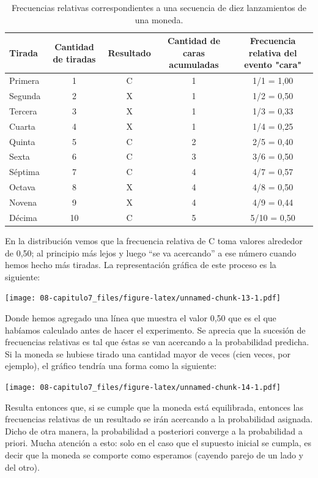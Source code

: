 \documentclass[]{article}
\begin{document}
\begin{table}

\caption{\label{tab:unnamed-chunk-12}Frecuencias relativas correspondientes a una secuencia de diez lanzamientos de una moneda.}
\centering
\begin{tabular}[t]{lcccc}
\toprule
Tirada & Cantidad de tiradas & Resultado & Cantidad de caras acumuladas & Frecuencia relativa del evento "cara"\\
\midrule
\rowcolor{gray!6}  Primera & 1 & C & 1 & 1/1 = 1,00\\
Segunda & 2 & X & 1 & 1/2 = 0,50\\
\rowcolor{gray!6}  Tercera & 3 & X & 1 & 1/3 = 0,33\\
Cuarta & 4 & X & 1 & 1/4 = 0,25\\
\rowcolor{gray!6}  Quinta & 5 & C & 2 & 2/5 = 0,40\\
\addlinespace
Sexta & 6 & C & 3 & 3/6 = 0,50\\
\rowcolor{gray!6}  Séptima & 7 & C & 4 & 4/7 = 0,57\\
Octava & 8 & X & 4 & 4/8 = 0,50\\
\rowcolor{gray!6}  Novena & 9 & X & 4 & 4/9 = 0,44\\
Décima & 10 & C & 5 & 5/10 = 0,50\\
\bottomrule
\end{tabular}
\end{table}

En la distribución vemos que la frecuencia relativa de C toma valores
alrededor de 0,50; al principio más lejos y luego ``se va acercando'' a
ese número cuando hemos hecho más tiradas. La representación gráfica de
este proceso es la siguiente:

\texttt{[image: 08-capitulo7\_files/figure-latex/unnamed-chunk-13-1.pdf]}

Donde hemos agregado una línea que muestra el valor 0,50 que es el que
habíamos calculado antes de hacer el experimento. Se aprecia que la
sucesión de frecuencias relativas es tal que éstas se van acercando a la
probabilidad predicha. Si la moneda se hubiese tirado una cantidad mayor
de veces (cien veces, por ejemplo), el gráfico tendría una forma como la
siguiente:

\texttt{[image: 08-capitulo7\_files/figure-latex/unnamed-chunk-14-1.pdf]}

Resulta entonces que, si se cumple que la moneda está equilibrada,
entonces las frecuencias relativas de un resultado se irán acercando a
la probabilidad asignada. Dicho de otra manera, la probabilidad a
posteriori converge a la probabilidad a priori. Mucha atención a esto:
solo en el caso que el supuesto inicial se cumpla, es decir que la
moneda se comporte como esperamos (cayendo parejo de un lado y del
otro).
\end{document}
